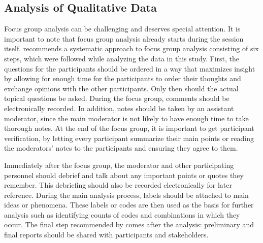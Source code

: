 \subsection{Analysis of Qualitative Data}
Focus group analysis can be challenging and deserves special attention. It is important to note that focus group analysis already starts during the session itself.  recommends a systematic approach to focus group analysis consisting of six steps, which were followed while analyzing the data in this study. First, the questions for the participants should be ordered in a way that maximizes insight by allowing for enough time for the participants to order their thoughts and exchange opinions with the other participants. Only then should the actual topical questions be asked. During the focus group, comments should be electronically recorded. In addition, notes should be taken by an assistant moderator, since the main moderator is not likely to have enough time to take thorough notes. At the end of the focus group, it is important to get participant verification, by letting every participant summarize their main points or reading the moderators' notes to the participants and ensuring they agree to them.

Immediately after the focus group, the moderator and other participating personnel should debrief and talk about any important points or quotes they remember. This debriefing should also be recorded electronically for later reference. During the main analysis process, labels should be attached to main ideas or phenomena. These labels or codes are then used as the basis for further analysis such as identifying counts of codes and combinations in which they occur. The final step recommended by \citet{Krueger1998} comes after the analysis: preliminary and final reports should be shared with participants and stakeholders.
